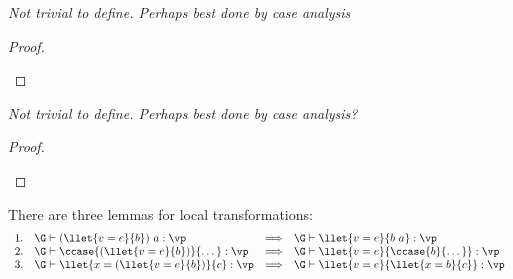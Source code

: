 \begin{lemma}
    \emph{Not trivial to define. Perhaps best done by case analysis}
\end{lemma}

\begin{proof}~

\begin{tabbing}

\end{tabbing}
\end{proof}


\begin{lemma}
    \emph{Not trivial to define. Perhaps best done by case analysis?}
\end{lemma}

\begin{proof}~

\begin{tabbing}

\end{tabbing}
\end{proof}



\begin{lemma}
There are three lemmas for local transformations:
  \[
  \begin{array}{llcl}
  1. & \G \vdash (\llet{v = e}{b})~a : \vp & \Longrightarrow & \G \vdash \llet{v = e}{b~a} : \vp\\
  2. & \G \vdash \ccase{(\llet{v = e}{b})}{\dots} : \vp & \Longrightarrow & \G \vdash \llet{v = e}{\ccase{b}{\dots}} : \vp\\
  3. & \G \vdash \llet{x = (\llet{v = e}{b})}{c} : \vp & \Longrightarrow & \G \vdash \llet{v = e}{\llet{x = b}{c}} : \vp\\
  \end{array}
  \]
\end{lemma}

